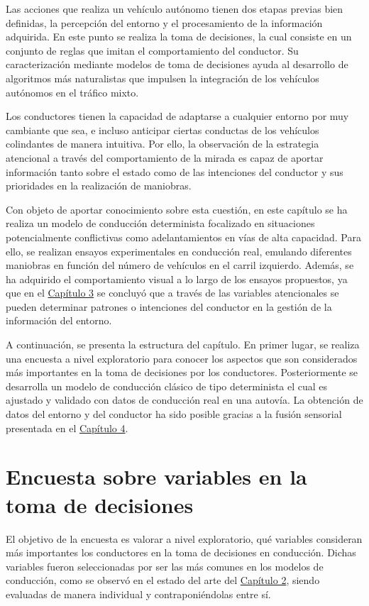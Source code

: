 Las acciones que realiza un vehículo autónomo tienen dos etapas previas bien definidas, la percepción del entorno y el procesamiento de la información adquirida. En este punto se realiza la toma de decisiones, la cual consiste en un conjunto de reglas que imitan el comportamiento del conductor. Su caracterización mediante modelos de toma de decisiones ayuda al desarrollo de algoritmos más naturalistas que impulsen la integración de los vehículos autónomos en el tráfico mixto. 

Los conductores tienen la capacidad de adaptarse a cualquier entorno por muy cambiante que sea, e incluso anticipar ciertas conductas de los vehículos colindantes de manera intuitiva. Por ello, la observación de la estrategia atencional a través del comportamiento de la mirada es capaz de aportar información tanto sobre el estado como de las intenciones del conductor y sus prioridades en la realización de maniobras.

Con objeto de aportar conocimiento sobre esta cuestión, en este capítulo se ha realiza un modelo de conducción determinista focalizado en situaciones potencialmente conflictivas como adelantamientos en vías de alta capacidad. Para ello, se realizan ensayos experimentales en conducción real, emulando diferentes maniobras en función del número de vehículos en el carril izquierdo. Además, se ha adquirido el comportamiento visual a lo largo de los ensayos propuestos, ya que en el \hyperref[ch3]{Capítulo 3} se concluyó que a través de las variables atencionales se pueden determinar patrones o intenciones del conductor en la gestión de la información del entorno.

A continuación, se presenta la estructura del capítulo. En primer lugar, se realiza una encuesta a nivel exploratorio para conocer los aspectos que son considerados más importantes en la toma de decisiones por los conductores. Posteriormente se desarrolla un modelo de conducción clásico de tipo determinista el cual es ajustado y validado con datos de conducción real en una autovía. La obtención de datos del entorno y del conductor ha sido posible gracias a la fusión sensorial presentada en el \hyperref[ch4]{Capítulo 4}.

\section{Encuesta sobre variables en la toma de decisiones}\label{51}
El objetivo de la encuesta es valorar a nivel exploratorio, qué variables consideran más importantes los conductores en la toma de decisiones en conducción. Dichas variables fueron seleccionadas por ser las más comunes en los modelos de conducción, como se observó en el estado del arte del \hyperref[ch2]{Capítulo 2}, siendo evaluadas de manera individual y contraponiéndolas entre sí. 

